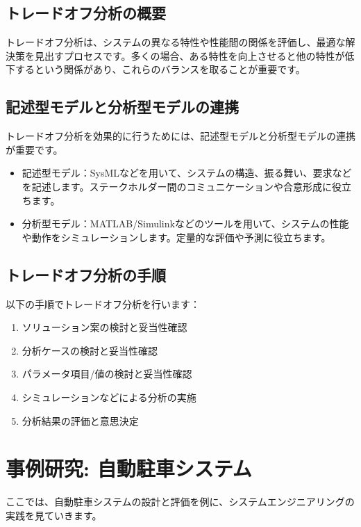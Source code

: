 \subsection{トレードオフ分析の概要}

トレードオフ分析は、システムの異なる特性や性能間の関係を評価し、最適な解決策を見出すプロセスです。多くの場合、ある特性を向上させると他の特性が低下するという関係があり、これらのバランスを取ることが重要です。

\subsection{記述型モデルと分析型モデルの連携}

トレードオフ分析を効果的に行うためには、記述型モデルと分析型モデルの連携が重要です。

\begin{itemize}
    \item 記述型モデル：SysMLなどを用いて、システムの構造、振る舞い、要求などを記述します。ステークホルダー間のコミュニケーションや合意形成に役立ちます。
    \item 分析型モデル：MATLAB/Simulinkなどのツールを用いて、システムの性能や動作をシミュレーションします。定量的な評価や予測に役立ちます。
\end{itemize}

\subsection{トレードオフ分析の手順}

以下の手順でトレードオフ分析を行います：

\begin{enumerate}
    \item ソリューション案の検討と妥当性確認
    \item 分析ケースの検討と妥当性確認
    \item パラメータ項目/値の検討と妥当性確認
    \item シミュレーションなどによる分析の実施
    \item 分析結果の評価と意思決定
\end{enumerate}

\section{事例研究: 自動駐車システム}

ここでは、自動駐車システムの設計と評価を例に、システムエンジニアリングの実践を見ていきます。

